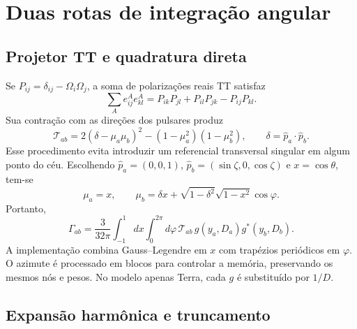 \section{Duas rotas de integração angular}

\subsection{Projetor TT e quadratura direta}

Se \(P_{ij}=\delta_{ij}-\Omega_i\Omega_j\), a soma de
polarizações reais TT satisfaz
\begin{equation}
 \sum_A e_{ij}^Ae_{kl}^A
       =P_{ik}P_{jl}+P_{il}P_{jk}-P_{ij}P_{kl}.
 \label{eq:pta-projetor-tt}
\end{equation}
Sua contração com as direções dos pulsares produz
\begin{equation}
 \mathcal T_{ab}
 =2(\delta-\mu_a\mu_b)^2
       -(1-\mu_a^2)(1-\mu_b^2),
 \qquad\delta=\hat p_a\cdot\hat p_b.
 \label{eq:pta-soma-tensorial}
\end{equation}
Esse procedimento evita introduzir um referencial transversal
singular em algum ponto do céu. Escolhendo
\(\hat p_a=(0,0,1)\), \(\hat p_b=(\sin\zeta,0,\cos\zeta)\)
e \(x=\cos\theta\), tem-se
\begin{equation}
 \mu_a=x,\qquad
 \mu_b=\delta x+\sqrt{1-\delta^2}\sqrt{1-x^2}\cos\varphi.
 \label{eq:pta-mu-b}
\end{equation}
Portanto,
\begin{equation}
 \Gamma_{ab}=\frac{3}{32\pi}
 \int_{-1}^{1}dx\int_0^{2\pi}d\varphi\,
 \mathcal T_{ab}\,g(y_a,D_a)g^*(y_b,D_b).
 \label{eq:pta-integral-direta}
\end{equation}
A implementação combina Gauss--Legendre em \(x\) com trapézios
periódicos em \(\varphi\). O azimute é processado em blocos para
controlar a memória, preservando os mesmos nós e pesos. No modelo
apenas Terra, cada \(g\) é substituído por \(1/D\).

\subsection{Expansão harmônica e truncamento}

